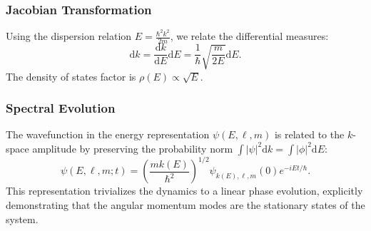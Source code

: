 \subsubsection{Jacobian Transformation}
Using the dispersion relation $E = \frac{\hbar^2 k^2}{2m}$, we relate the
differential measures:
\begin{equation}
	\mathrm{d}k = \frac{\mathrm{d}k}{\mathrm{d}E} \mathrm{d}E = \frac{1}{\hbar}
	\sqrt{\frac{m}{2E}} \mathrm{d}E.
\end{equation}
The density of states factor is $\rho(E) \propto \sqrt{E}$.

\subsubsection{Spectral Evolution}
The wavefunction in the energy representation $\psi(E, \ell, m)$ is related to
the $k$-space amplitude by preserving the probability norm $\int |\psi|^2
\mathrm{d}k = \int |\phi|^2 \mathrm{d}E$:
\begin{equation}
	\psi(E, \ell, m; t) = \left( \frac{m k(E)}{\hbar^2} \right)^{1/2}
	\psi_{k(E), \ell, m}(0) e^{-iEt/\hbar}.
\end{equation}
This representation trivializes the dynamics to a linear phase evolution,
explicitly demonstrating that the angular momentum modes are the stationary
states of the system.
